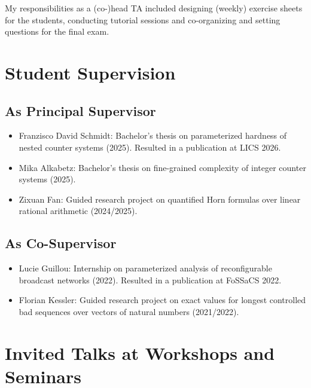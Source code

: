 \documentclass[11pt,a4paper,sans]{moderncv}        %
\begin{document}
\begin{itemize}
	\vspace{4pt}
		My responsibilities as a (co-)head TA included designing (weekly) exercise sheets for the students, conducting tutorial sessions 
	and co-organizing and setting questions for the final exam. 
	
\end{itemize}

\section{Student Supervision}

\subsection{As Principal Supervisor}
\vspace{2pt}

\begin{itemize}
	\setlength{\itemsep}{2pt}
	\item Franzisco David Schmidt: Bachelor's thesis on parameterized hardness of nested counter systems (2025). Resulted in a publication at LICS 2026.
	\item Mika Alkabetz: Bachelor's thesis on fine-grained complexity of integer counter systems (2025).
	\item Zixuan Fan: Guided research project on quantified Horn formulas over linear rational arithmetic (2024/2025).
\end{itemize}

\vspace{2pt}

\subsection{As Co-Supervisor}

\vspace{2pt}

\begin{itemize}
	\setlength{\itemsep}{2pt}
	\item Lucie Guillou: Internship on parameterized analysis of reconfigurable broadcast networks (2022).
	Resulted in a publication at FoSSaCS 2022.
	\item Florian Kessler: Guided research project on exact values for longest controlled bad sequences over vectors of natural numbers (2021/2022).
\end{itemize}

\section{Invited Talks at Workshops and Seminars}
\end{document}
